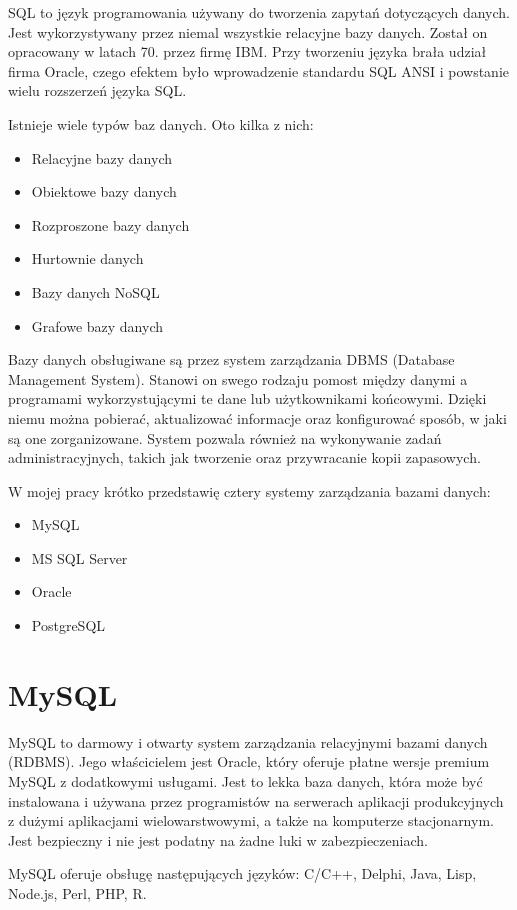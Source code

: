 \documentclass[oneside,polski,logo,indent]{amuthesis}
\begin{document}
SQL to język programowania używany do tworzenia zapytań dotyczących danych. Jest wykorzystywany przez niemal wszystkie relacyjne bazy danych. Został on opracowany w latach 70. przez firmę IBM. Przy tworzeniu języka brała udział firma Oracle, czego efektem było wprowadzenie standardu SQL ANSI i powstanie wielu rozszerzeń języka SQL.  

Istnieje wiele typów baz danych. Oto kilka z nich:  
\begin{itemize}
\item Relacyjne bazy danych
\item Obiektowe bazy danych
\item Rozproszone bazy danych
\item Hurtownie danych
\item Bazy danych NoSQL
\item Grafowe bazy danych
\end{itemize}

Bazy danych obsługiwane są przez system zarządzania DBMS (Database Management System). Stanowi on swego rodzaju pomost między danymi a programami wykorzystującymi te dane lub użytkownikami końcowymi. Dzięki niemu można pobierać, aktualizować informacje oraz konfigurować sposób, w jaki są one zorganizowane. System pozwala również na wykonywanie zadań administracyjnych, takich jak tworzenie oraz przywracanie kopii zapasowych.


W mojej pracy krótko przedstawię cztery systemy zarządzania bazami danych: 
\begin{itemize}
\item MySQL 
\item MS SQL Server 
\item Oracle 
\item PostgreSQL 
\end{itemize}
\section{MySQL}
MySQL to darmowy i otwarty system zarządzania relacyjnymi bazami danych (RDBMS). Jego właścicielem jest Oracle, który oferuje płatne wersje premium MySQL z dodatkowymi usługami. Jest to lekka baza danych, która może być instalowana i używana przez programistów na serwerach aplikacji produkcyjnych z dużymi aplikacjami wielowarstwowymi, a także na komputerze stacjonarnym. Jest bezpieczny i nie jest podatny na żadne luki w zabezpieczeniach. 

\indent MySQL oferuje obsługę następujących języków: C/C++, Delphi, Java, Lisp, Node.js, Perl, PHP, R.
\end{document}
